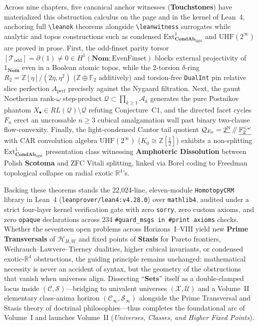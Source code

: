 \documentclass[10pt,twoside,openright]{book}
\theoremstyle{crmplain}
\theoremstyle{crmdef}
\theoremstyle{crmremark}
\providecommand{\sslash}{\mathbin{/\mkern-5mu/}}
\begin{document}
Across nine chapters, five canonical anchor witnesses (\textbf{Touchstones}) have materialized this obstruction calculus on the page and in the kernel of Lean~4, anchoring full \texttt{\textbackslash leanok} theorems alongside \texttt{\textbackslash leanwitness} surrogates while analytic and topos constructions such as condensed $\mathrm{Ext}^1_{\mathbf{CondAb}_{\mathrm{light}}}$ and $\mathrm{UHF}(2^\infty)$ are proved in prose. First, the odd-finset parity torsor $[\mathcal{T}_{\mathrm{odd}}] = \partial(1) \neq 0 \in H^1(\mathbf{Nom}; \mathrm{EvenFinset})$ blocks external projectivity of $1_{\mathbf{Nom}}$ even in a Boolean atomic topos, while the $2$-torsion $\delta$-ring $R_2 = \mathbb{Z}[\eta]/(2\eta, \eta^2)$ ($\mathbb{Z}\oplus\mathbb{F}_2$ additively) and torsion-free \texttt{DualInt} pin relative slice perfection $A_{\mathrm{perf}}$ precisely against the Nygaard filtration. Next, the gaunt Noetherian rank-$\omega$ step-product $\mathcal{Q} \subset \prod_{k \ge 1}\mathcal{A}_k$ generates the pure Postnikov phantom $X_\bullet \in RL(\mathcal{Q}) \setminus \mathcal{Q}$ refuting Conjecture~C1, and the directed facet cycles $F_n$ erect an uncrossable $n \ge 3$ cubical amalgamation wall past binary two-clause flow-convexity. Finally, the light-condensed Cantor tail quotient $\mathcal{Q}_{E_0} = \underline{2^{\mathbb{N}}} \sslash \underline{\mathbb{F}_2^{<\omega}}$ with CAR convolution algebra $\mathrm{UHF}(2^\infty)$ ($K_0 \cong \mathbb{Z}[\tfrac{1}{2}]$) exhibits a non-splitting $\mathrm{Ext}^1_{\mathbf{CondAb}_{\mathrm{light}}}$ presentation class witnessing \textbf{Amphoteric Dissolution} between Polish \textbf{Scotoma} and $\mathrm{ZFC}$ Vitali splitting, linked via Borel coding to Freedman topological collapse on radial exotic $\mathbb{R}^4$'s.

Backing these theorems stands the 22,024-line, eleven-module \texttt{HomotopyCRM} library in Lean~4 (\texttt{leanprover/lean4:v4.28.0}) over \texttt{mathlib4}, audited under a strict four-layer kernel verification gate with zero \texttt{sorry}, zero custom axioms, and zero \texttt{opaque} declarations across 234 \texttt{\#guard\_msgs in \#print axioms} checks. Whether the seventeen open problems across Horizons~I--VIII yield new \textbf{Prime Transversals} of $\mathcal{H}_{H,W}$ and fixed points of \textbf{Stasis} for Pareto frontiers, Weihrauch--Lawvere--Tierney dualities, higher cubical invariants, or condensed exotic-$\mathbb{R}^4$ obstructions, the guiding principle remains unchanged: mathematical necessity is never an accident of syntax, but the geometry of the obstructions that vanish when universes align. Dissecting ``$\mathbf{Sets}$'' itself as a double-clamped locus inside $(\mathcal{C}, \mathcal{S})$---bridging to univalent universes $(\mathcal{X}, \mathcal{U})$ and a Volume~II elementary class-anima horizon $(\mathcal{C}_\infty, \mathcal{S}_\infty)$ alongside the Prime Transversal and Stasis theory of doctrinal philosophies---thus completes the foundational arc of Volume~I and launches Volume~II (\emph{Universes, Classes, and Higher Fixed Points}).
\end{document}
